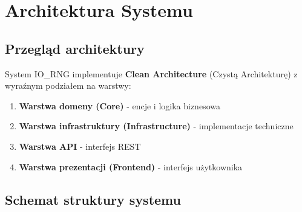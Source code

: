 \documentclass[12pt,a4paper]{article}
\begin{document}
\section{Architektura Systemu}

\subsection{Przegląd architektury}

System IO\_RNG implementuje \textbf{Clean Architecture} (Czystą Architekturę) z wyraźnym podziałem na warstwy:

\begin{enumerate}
    \item \textbf{Warstwa domeny (Core)} - encje i logika biznesowa
    \item \textbf{Warstwa infrastruktury (Infrastructure)} - implementacje techniczne
    \item \textbf{Warstwa API} - interfejs REST
    \item \textbf{Warstwa prezentacji (Frontend)} - interfejs użytkownika
\end{enumerate}

\subsection{Schemat struktury systemu}
\end{document}

